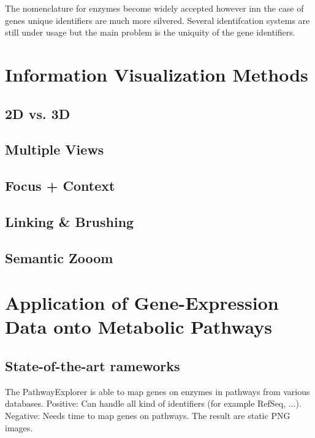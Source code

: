 The nomenclature for enzymes become widely accepted however inn the case of genes unique identifiers are much more silvered.
Several identifcation systems are still under usage but the main problem is the uniquity of the gene identifiers.


\section{Information Visualization Methods}

\subsection{2D vs. 3D}

\subsection{Multiple Views}
\subsection{Focus + Context}
\subsection{Linking \& Brushing}
\subsection{Semantic Zooom}

\section{Application of Gene-Expression Data onto Metabolic Pathways}


\subsection{State-of-the-art rameworks}


The PathwayExplorer is able to map genes on enzymes in pathways from various databases.
Positive: Can handle all kind of identifiers (for example RefSeq, ...).
Negative: Needs time to map genes on pathways. The result are static PNG images.

